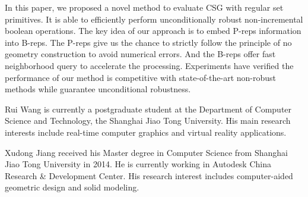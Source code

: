 \documentclass[10pt,journal,compsoc]{IEEEtran}
\begin{document}
In this paper, we proposed a novel method to evaluate CSG with regular set primitives. It is able to efficiently perform unconditionally robust non-incremental boolean operations. The key idea of our approach is to embed P-reps information into B-reps. The P-reps give us the chance to strictly follow the principle of no geometry construction to avoid numerical errors. And the B-reps offer fast neighborhood query to accelerate the processing. Experiments have verified the performance of our method is competitive with state-of-the-art non-robust methods while guarantee unconditional robustness.



\appendices







\begin{IEEEbiography}{Rui Wang}
is currently a postgraduate student at the Department of Computer Science and Technology, the Shanghai Jiao Tong University. His main research interests include real-time computer graphics and virtual reality applications.
\end{IEEEbiography}

\begin{IEEEbiography}{Xudong Jiang}
received his Master degree in Computer Science from Shanghai Jiao Tong University in 2014. He is currently working in Autodesk China Research \& Development Center. His research interest includes computer-aided geometric design and solid modeling.
\end{IEEEbiography}
\end{document}
